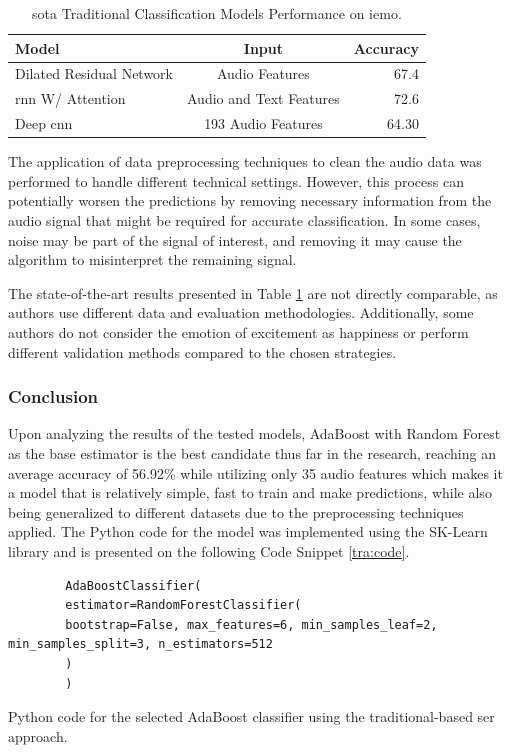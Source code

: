 \begin{table}[H]
	\centering
	\caption{\ac{sota} Traditional Classification Models Performance on \ac{iemo}.}
	\label{tab:modelssoa}
	\begin{tabular}{lcr}
		\toprule
		Model                        &   Input &   Accuracy \\
		\midrule
		
		Dilated Residual Network \cite{Li_2019}	& Audio Features & 67.4 \\
		
		\ac{rnn} W/ Attention \cite{Lu_2020} & Audio and Text Features & 72.6 \\
		
		Deep \ac{cnn} \cite{Issa_2020} & 193 Audio Features & 64.30 \\
		
		\bottomrule
	\end{tabular}
\end{table}


The application of data preprocessing techniques to clean the audio data was performed to handle different technical settings. However, this process can potentially worsen the predictions by removing necessary information from the audio signal that might be required for accurate classification. In some cases, noise may be part of the signal of interest, and removing it may cause the algorithm to misinterpret the remaining signal.

The state-of-the-art results presented in Table \ref{tab:modelssoa} are not directly comparable, as authors use different data and evaluation methodologies. Additionally, some authors do not consider the emotion of excitement as happiness or perform different validation methods compared to the chosen strategies.

\subsubsection{Conclusion}

Upon analyzing the results of the tested models, AdaBoost with Random Forest as the base estimator is the best candidate thus far in the research, reaching an average accuracy of 56.92\% while utilizing only 35 audio features which makes it a model that is relatively simple, fast to train and make predictions, while also being generalized to different datasets due to the preprocessing techniques applied. The Python code for the model was implemented using the SK-Learn library and is presented on the following  Code Snippet \ref{tra:code}.

\begin{listing}[H]
	\begin{verbatim}
		AdaBoostClassifier(
		estimator=RandomForestClassifier(
		bootstrap=False, max_features=6, min_samples_leaf=2, min_samples_split=3, n_estimators=512
		)
		)
	\end{verbatim}
	\caption{Python code for the selected AdaBoost classifier using the traditional-based \ac{ser} approach.}
	\label{tra:code}
\end{listing}